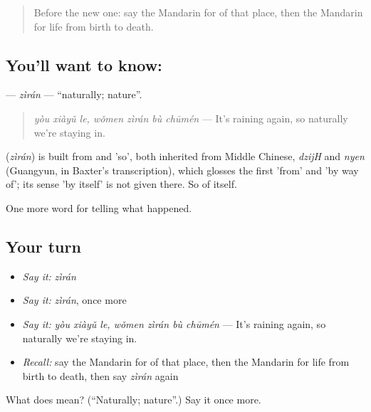 \label{lesson:ZH-C316-ziran}



\begin{quote}
Before the new one: say the Mandarin for of that place, then the Mandarin for life from birth to death.
\end{quote}

\subsection*{You'll want to know: }
\textbf{} — \emph{zìrán} — \textquotedblleft{}naturally; nature\textquotedblright{}.

\begin{quote}
\textbf{} \emph{yòu xiàyǔ le, wǒmen zìrán bù chūmén} — It's raining again, so naturally we're staying in.
\end{quote}

\begin{cousinweb}
\textbf{} (\emph{zìrán}) is built from  and  'so', both inherited from Middle Chinese, \emph{dzijH} and \emph{nyen} (Guangyun, in Baxter's transcription), which glosses the first 'from' and 'by way of'; its sense 'by itself' is not given there. So of itself.
\end{cousinweb}

\begin{grammarlens}[title={What you've built}]
One more word for telling what happened.
\end{grammarlens}

\subsection*{Your turn}
\begin{itemize}
\raggedright
  \item \emph{Say it:} \emph{zìrán}
  \item \emph{Say it:} \emph{zìrán}, once more
  \item \emph{Say it:} \emph{yòu xiàyǔ le, wǒmen zìrán bù chūmén} — It's raining again, so naturally we're staying in.
  \item \emph{Recall:} say the Mandarin for of that place, then the Mandarin for life from birth to death, then say \emph{zìrán} again
\end{itemize}

\begin{tcolorbox}[breakable,colback=teal!4,colframe=teal!35!black,title={Before you move on}]
What does  mean? (\textquotedblleft{}Naturally; nature\textquotedblright{}.) Say it once more.
\end{tcolorbox}
